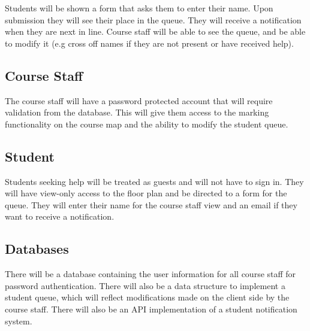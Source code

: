 \documentclass{article}
\begin{document}
Students will be shown a form that asks them to enter their name. Upon submission they will see their place in the queue. They will receive a notification when they are next in line. Course staff will be able to see the queue, and be able to modify it (e.g cross off names if they are not present or have received help).

\subsection*{Course Staff}

The course staff will have a password protected account that will require validation from the database. This will give them access to the marking functionality on the course map and the ability to modify the student queue.

\subsection*{Student}

Students seeking help will be treated as guests and will not have to sign in. They will have view-only access to the floor plan and be directed to a form for the queue. They will enter their name for the course staff view and an email if they want to receive a notification.

\subsection*{Databases}

There will be a database containing the user information for all course staff for password authentication. There will also be a data structure to implement a student queue, which will reflect modifications made on the client side by the course staff. There will also be an API implementation of a student notification system.
\end{document}
